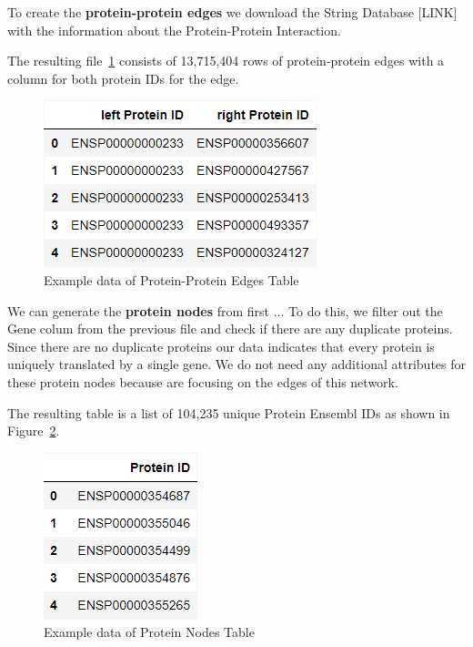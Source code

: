 To create the \textbf{protein-protein edges} we download the String Database [LINK] with the information about the Protein-Protein Interaction.

The resulting file~\ref{fig:03_02_df_protein_edges} consists of 13,715,404 rows of protein-protein edges with a column for both protein IDs for the edge.
\begin{figure}[h]
    \centering
    \includegraphics[height=\dfheight]{figures/03_02_protein_edges}
    \caption{Example data of Protein-Protein Edges Table}
    \label{fig:03_02_df_protein_edges}
\end{figure}


We can generate the \textbf{protein nodes} from first ...
To do this, we filter out the Gene colum from the previous file and check if there are any duplicate proteins.
Since there are no duplicate proteins our data indicates that every protein is uniquely translated by a single gene.
We do not need any additional attributes for these protein nodes because are focusing on the edges of this network.

The resulting table is a list of 104,235 unique Protein Ensembl IDs as shown in Figure~\ref{fig:03_02_df_protein_nodes}.
\begin{figure}[h]
    \centering
    \includegraphics[height=\dfheight]{figures/03_02_protein_nodes}
    \caption{Example data of Protein Nodes Table}
    \label{fig:03_02_df_protein_nodes}
\end{figure}


